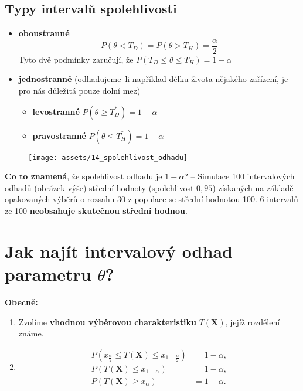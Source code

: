 \subsection*{Typy intervalů spolehlivosti}
\begin{itemize}
    \item \textbf{oboustranné}
          \begin{equation*}
              P(\theta < T_D) = P(\theta > T_H) = \frac{\alpha}{2}
          \end{equation*}
          Tyto dvě podmínky zaručují, že $P(T_D \leq \theta \leq T_H) = 1 - \alpha$
    \item \textbf{jednostranné} (odhadujeme--li například délku života nějakého zařízení, je pro nás důležitá pouze dolní mez)
          \begin{itemize}
              \item \textbf{levostranné} $P(\theta \geq T_D^*) = 1 - \alpha$
              \item \textbf{pravostranné} $P(\theta \leq T_H^*) = 1 - \alpha$
          \end{itemize}
\end{itemize}
\begin{figure}[H]
    \centering
    \texttt{[image: assets/14\_spolehlivost\_odhadu]}
\end{figure}
\textbf{Co to znamená}, že spolehlivost odhadu je $1- \alpha$? -- Simulace 100 intervalových odhadů  (obrázek výše) střední hodnoty (spolehlivost $0,95$) získaných na základě opakovaných výběrů o rozsahu 30 z populace se střední hodnotou 100. 6 intervalů ze 100 \textbf{neobsahuje skutečnou střední hodnou}.
\section{Jak najít intervalový odhad parametru $\theta$?}
\textbf{Obecně:}
\begin{enumerate}
    \item Zvolíme \textbf{vhodnou výběrovou charakteristiku} $T(\mathbf{X})$, jejíž rozdělení známe.
    \item \begin{equation*}
              \begin{split}
                  P(x_\frac{\alpha}{2} \leq T(\mathbf{X}) \leq x_{1 - \frac{\alpha}{2}}) &= 1 - \alpha, \\
                  P(T(\mathbf{X}) \leq x_{1-\alpha}) &= 1 - \alpha, \\
                  P(T(\mathbf{X}) \geq x_\alpha) &= 1 - \alpha.
              \end{split}
          \end{equation*}
\end{enumerate}

